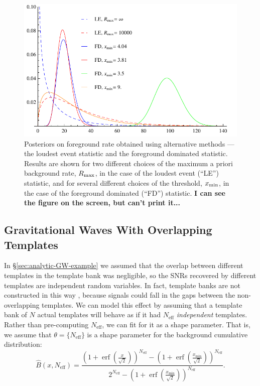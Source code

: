 \documentclass[aps,prd]{revtex4-1}
\newcommand{\xmin}{x_\mathrm{min}}
\newcommand{\ilya}[1]{{\color{red} \bf #1}}
\DeclareMathOperator{\erf}{erf}
\begin{document}
\begin{figure}
  \includegraphics[width=\columnwidth]{AltMethodComp}
  \caption{\label{fig:altmeth}Posteriors on foreground rate obtained
    using alternative methods --- the loudest event statistic and the
    foreground dominated statistic. Results are shown for two
    different choices of the maximum a priori background rate, $R_{\rm
      max}$, in the case of the loudest event (``LE'') statistic, and
    for several different choices of the threshold, $x_{\rm min}$, in
    the case of the foreground dominated (``FD'') statistic. \ilya{I can see the figure on the screen, but can't print it...}}
\end{figure}

\subsection{Gravitational Waves With Overlapping Templates}
\label{sec:gw-overlapping-template}

In \S \ref{sec:analytic-GW-example} we assumed that the overlap
between different templates in the template bank was negligible, so
the SNRs recovered by different templates are independent random
variables.  In fact, template banks are not constructed in this way
\citep[e.g.,][]{Owen:1998dk,Ajith:2008},
because signals could fall in the gaps between the non-overlapping
templates.  We can model this effect by assuming that a template bank
of $N$ actual templates will behave as if it had $N_\mathrm{eff}$
\emph{independent} templates.  Rather than pre-computing
$N_\mathrm{eff}$, we can fit for it as a shape parameter.  That is, we
assume that $\theta = \{N_\mathrm{eff}\}$ is a shape parameter for the
background cumulative distribution:
\begin{equation}
  \hat{B}\left(x, N_\mathrm{eff}\right) = \frac{\left( 1 + \erf\left( \frac{x}{\sqrt{2}} \right)
    \right)^{N_\mathrm{eff}} - \left( 1 + \erf\left( \frac{\xmin}{\sqrt{2}} \right)
    \right)^{N_\mathrm{eff}}}{2^{N_\mathrm{eff}} - \left( 1 + \erf\left( \frac{\xmin}{\sqrt{2}} \right)
    \right)^{N_\mathrm{eff}} }.
\end{equation}
\end{document}
